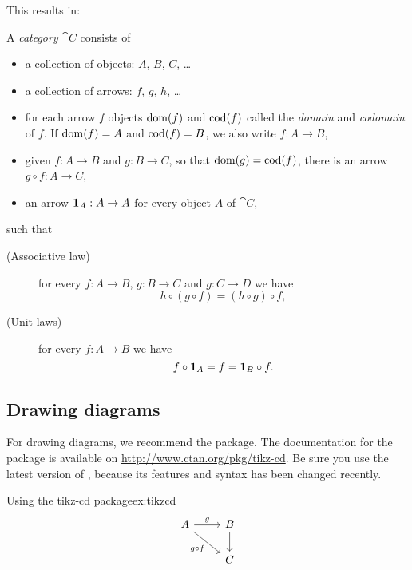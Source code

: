 This results in:
\begin{Definition}
A \emph{category} \(\cat{C}\) consists of
\begin{itemize}
\item a collection of objects: \(A\), \(B\), \(C\), \ldots
\item a collection of arrows: \(f\), \(g\), \(h\), \ldots
\item for each arrow \(f\) objects \(\domain{f}\) and \(\codomain{f}\) called
the \emph{domain} and \emph{codomain} of \(f\). If \(\domain{f}=A\) and \(\codomain{f}=B\),
we also write \(f:A\to B\),
\item given \(f:A\to B\) and \(g:B\to C\), so that \(\domain{g}=\codomain{f}\), there
is an arrow \(g\circ f:A\to C\),
\item an arrow \(\idarrow[A]:A\to A\) for every object \(A\) of \(\cat{C}\),
\end{itemize}
such that
\begin{description}
\item[(Associative law)] for every \(f:A\to B\), \(g:B\to C\) and \(g:C\to D\) we have
\begin{equation*}
h\circ(g\circ f)=(h\circ g)\circ f,
\end{equation*}
\item[(Unit laws)] for every \(f:A\to B\) we have
\begin{equation*}
f\circ\idarrow[A]=f=\idarrow[B]\circ f.
\end{equation*}
\end{description}
\end{Definition}


\subsection{Drawing diagrams}

For drawing diagrams, we recommend the  package. The documentation
for the  package is available on \url{http://www.ctan.org/pkg/tikz-cd}.
Be sure you use the latest version of , because its features and
syntax has been changed recently.

\begin{texexample}{Using the tikz-cd package}{ex:tikzcd}
\[
\begin{tikzcd}
A \arrow[dr, swap,"g \circ f"] \arrow[r, "g"] & B  \arrow[d]\\
& C\\
\end{tikzcd}
\]
\end{texexample}

